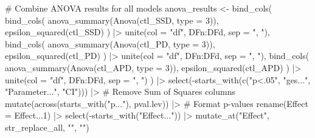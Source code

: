 \documentclass[
  bookmarksnumbered]{article}
\newenvironment{Shaded}{\begin{snugshade}}{\end{snugshade}}
\newcommand{\AttributeTok}[1]{\textcolor[rgb]{0.80,0.80,0.80}{#1}}
\newcommand{\CommentTok}[1]{\textcolor[rgb]{0.50,0.62,0.50}{#1}}
\newcommand{\DecValTok}[1]{\textcolor[rgb]{0.86,0.86,0.80}{#1}}
\newcommand{\FunctionTok}[1]{\textcolor[rgb]{0.94,0.94,0.56}{#1}}
\newcommand{\NormalTok}[1]{\textcolor[rgb]{0.80,0.80,0.80}{#1}}
\newcommand{\OtherTok}[1]{\textcolor[rgb]{0.94,0.94,0.56}{#1}}
\newcommand{\SpecialCharTok}[1]{\textcolor[rgb]{0.86,0.64,0.64}{#1}}
\newcommand{\StringTok}[1]{\textcolor[rgb]{0.80,0.58,0.58}{#1}}
\begin{document}
\begin{Shaded}
\begin{Highlighting}[]
\CommentTok{\# Combine ANOVA results for all models}
\NormalTok{anova\_results }\OtherTok{\textless{}{-}} \FunctionTok{bind\_cols}\NormalTok{(}
  \FunctionTok{bind\_cols}\NormalTok{(}
    \FunctionTok{anova\_summary}\NormalTok{(}\FunctionTok{Anova}\NormalTok{(ctl\_SSD, }\AttributeTok{type =} \DecValTok{3}\NormalTok{)),}
    \FunctionTok{epsilon\_squared}\NormalTok{(ctl\_SSD)}
\NormalTok{  ) }\SpecialCharTok{|\textgreater{}}
    \FunctionTok{unite}\NormalTok{(}\AttributeTok{col =} \StringTok{"df"}\NormalTok{, DFn}\SpecialCharTok{:}\NormalTok{DFd, }\AttributeTok{sep =} \StringTok{", "}\NormalTok{),}
  \FunctionTok{bind\_cols}\NormalTok{(}
    \FunctionTok{anova\_summary}\NormalTok{(}\FunctionTok{Anova}\NormalTok{(ctl\_PD, }\AttributeTok{type =} \DecValTok{3}\NormalTok{)),}
    \FunctionTok{epsilon\_squared}\NormalTok{(ctl\_PD)}
\NormalTok{  ) }\SpecialCharTok{|\textgreater{}}
    \FunctionTok{unite}\NormalTok{(}\AttributeTok{col =} \StringTok{"df"}\NormalTok{, DFn}\SpecialCharTok{:}\NormalTok{DFd, }\AttributeTok{sep =} \StringTok{", "}\NormalTok{),}
  \FunctionTok{bind\_cols}\NormalTok{(}
    \FunctionTok{anova\_summary}\NormalTok{(}\FunctionTok{Anova}\NormalTok{(ctl\_APD, }\AttributeTok{type =} \DecValTok{3}\NormalTok{)),}
    \FunctionTok{epsilon\_squared}\NormalTok{(ctl\_APD)}
\NormalTok{  ) }\SpecialCharTok{|\textgreater{}}
    \FunctionTok{unite}\NormalTok{(}\AttributeTok{col =} \StringTok{"df"}\NormalTok{, DFn}\SpecialCharTok{:}\NormalTok{DFd, }\AttributeTok{sep =} \StringTok{", "}\NormalTok{)}
\NormalTok{) }\SpecialCharTok{|\textgreater{}}
  \FunctionTok{select}\NormalTok{(}\SpecialCharTok{{-}}\FunctionTok{starts\_with}\NormalTok{(}\FunctionTok{c}\NormalTok{(}\StringTok{"p\textless{}.05"}\NormalTok{, }\StringTok{"ges..."}\NormalTok{, }\StringTok{"Parameter..."}\NormalTok{, }\StringTok{"CI"}\NormalTok{))) }\SpecialCharTok{|\textgreater{}} \CommentTok{\# Remove Sum of Squares columns}
  \FunctionTok{mutate}\NormalTok{(}\FunctionTok{across}\NormalTok{(}\FunctionTok{starts\_with}\NormalTok{(}\StringTok{"p..."}\NormalTok{), pval.lev)) }\SpecialCharTok{|\textgreater{}} \CommentTok{\# Format p{-}values}
  \FunctionTok{rename}\NormalTok{(}\AttributeTok{Effect =}\NormalTok{ Effect...}\DecValTok{1}\NormalTok{) }\SpecialCharTok{|\textgreater{}}
  \FunctionTok{select}\NormalTok{(}\SpecialCharTok{{-}}\FunctionTok{starts\_with}\NormalTok{(}\StringTok{"Effect..."}\NormalTok{)) }\SpecialCharTok{|\textgreater{}}
  \FunctionTok{mutate\_at}\NormalTok{(}\StringTok{"Effect"}\NormalTok{, str\_replace\_all, }\StringTok{"\textasciigrave{}"}\NormalTok{, }\StringTok{""}\NormalTok{)}


\end{Highlighting}
\end{Shaded}
\end{document}
